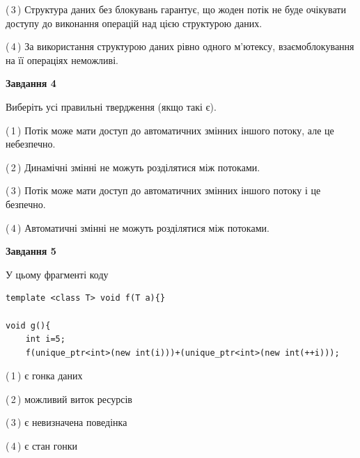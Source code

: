 \documentclass[12pt, ukrainian]{article}
\begin{document}
\begin {large}
{(\,3\,) Структура даних без блокувань гарантує, що жоден потік не буде очікувати доступу до виконання операцій над цією структурою даних.%

(\,4\,) За використання структурою даних рівно одного м’ютексу, взаємоблокування на її операціях неможливі.%



\begin{center}
\textbf{Завдання 4}
\end{center}
Виберіть усі правильні твердження (якщо такі є).\par
\vspace{2mm}

(\,1\,) Потік може мати доступ до автоматичних змінних іншого потоку, але це небезпечно.%

(\,2\,) Динамічні змінні не можуть розділятися між потоками.%

(\,3\,) Потік може мати доступ до автоматичних змінних іншого потоку і це безпечно.%

(\,4\,) Автоматичні змінні не можуть розділятися між потоками.%



\begin{center}
\textbf{Завдання 5}
\end{center}
У цьому фрагменті коду
\begin{verbatim}
template <class T> void f(T a){}

void g(){
    int i=5;
    f(unique_ptr<int>(new int(i)))+(unique_ptr<int>(new int(++i)));
\end{verbatim}
(\,1\,) є гонка даних%

(\,2\,) можливий виток ресурсів%

(\,3\,) є невизначена поведінка%

(\,4\,) є стан гонки%


}
\end {large}
\end{document}
